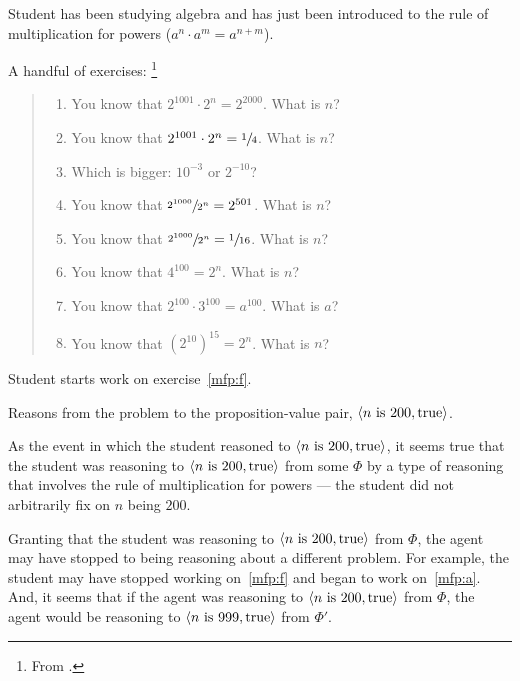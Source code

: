 \begin{note}
  \begin{illustration}[Textbook]
    Student has been studying algebra and has just been introduced to the rule of multiplication for powers (\(a^{n} \cdot a^{m} = a^{n + m}\)).

    A handful of exercises:%
    \footnote{
      From \textcite[31]{Gelfand:1993aa}.
    }

    \begin{quote}
      \begin{enumerate}[label=(\alph*), ref=(\alph*)]
      \item
        \label{mfp:a}
        You know that \(2^{1001} \cdot 2^{n} = 2^{2000}\).
        What is \(n\)?
      \item
        \label{mfp:b}
        You know that \(2^{1001} \cdot 2^{n} = \sfrac{1}{4}\).
        What is \(n\)?
      \item
        \label{mfp:c}
        Which is bigger: \(10^{-3}\) or \(2^{-10}\)?
      \item
        \label{mfp:d}
        You know that \(\sfrac{2^{1000}}{2^{n}} = 2^{501}\).
        What is \(n\)?
      \item
        \label{mfp:e}
        You know that \(\sfrac{2^{1000}}{2^{n}} = \sfrac{1}{16}\).
        What is \(n\)?
      \item
        \label{mfp:f}
        You know that \(4^{100} = 2^{n}\).
        What is \(n\)?
      \item
        \label{mfp:g}
        You know that \(2^{100} \cdot 3^{100} = a^{100}\).
        What is \(a\)?
      \item
        \label{mfp:h}
        You know that \((2^{10})^{15} = 2^{n}\).
        What is \(n\)?
      \end{enumerate}
    \end{quote}

    Student starts work on exercise~\ref{mfp:f}.

    Reasons from the problem to the proposition-value pair, \(\langle n\text{ is }200, \text{true} \rangle\).

    As the event in which the student reasoned to \(\langle n\text{ is }200, \text{true} \rangle\), it seems true that the student was reasoning to \(\langle n\text{ is }200, \text{true} \rangle\) from some \pool{} \(\Phi\) by a type of reasoning that involves the rule of multiplication for powers --- the student did not arbitrarily fix on \(n\) being \(200\).

    Granting that the student was reasoning to \(\langle n\text{ is }200, \text{true} \rangle\) from \(\Phi\), the agent may have stopped to being reasoning about a different problem.
    For example, the student may have stopped working on~\ref{mfp:f} and began to work on~\ref{mfp:a}.
    And, it seems that if the agent was reasoning to \(\langle n\text{ is }200, \text{true} \rangle\) from \(\Phi\), the agent would be reasoning to \(\langle n\text{ is }999, \text{true} \rangle\) from \(\Phi'\).


\end{illustration}
\end{note}
